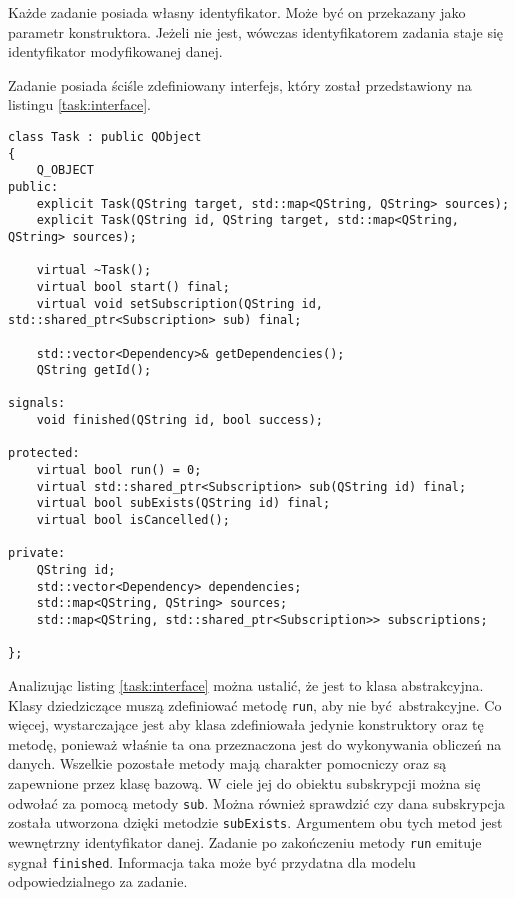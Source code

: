 Każde zadanie posiada własny identyfikator. Może być on przekazany jako parametr konstruktora. Jeżeli nie jest, wówczas identyfikatorem zadania staje się identyfikator modyfikowanej danej.

Zadanie posiada ściśle zdefiniowany interfejs, który został przedstawiony na listingu \ref{task:interface}.

\begin{minipage}{\textwidth}
	\begin{lstlisting}[label=task:interface, caption={Interfejs klasy \lstinline$Task$},alsoletter={()[].=}]
class Task : public QObject
{
	Q_OBJECT
public:
	explicit Task(QString target, std::map<QString, QString> sources);
	explicit Task(QString id, QString target, std::map<QString, QString> sources);

	virtual ~Task();
	virtual bool start() final;
	virtual void setSubscription(QString id, std::shared_ptr<Subscription> sub) final;

	std::vector<Dependency>& getDependencies();
	QString getId();

signals:
	void finished(QString id, bool success);

protected:
	virtual bool run() = 0;
	virtual std::shared_ptr<Subscription> sub(QString id) final;
	virtual bool subExists(QString id) final;
	virtual bool isCancelled();

private:
	QString id;
	std::vector<Dependency> dependencies;
	std::map<QString, QString> sources;
	std::map<QString, std::shared_ptr<Subscription>> subscriptions;

};
	\end{lstlisting}
\end{minipage}

Analizując listing \ref{task:interface} można ustalić, że jest to klasa abstrakcyjna. Klasy dziedziczące muszą zdefiniować metodę \lstinline$run$, aby nie być abstrakcyjne. Co więcej, wystarczające jest aby klasa zdefiniowała jedynie konstruktory oraz tę metodę, ponieważ właśnie ta ona przeznaczona jest do wykonywania obliczeń na danych. Wszelkie pozostałe metody mają charakter pomocniczy oraz są zapewnione przez klasę bazową. W ciele jej do obiektu subskrypcji można się odwołać za pomocą metody \lstinline$sub$. Można również sprawdzić czy dana subskrypcja została utworzona dzięki metodzie \lstinline$subExists$. Argumentem obu tych metod jest wewnętrzny identyfikator danej. Zadanie po zakończeniu metody \lstinline$run$ emituje sygnał \lstinline$finished$. Informacja taka może być przydatna dla modelu odpowiedzialnego za zadanie.


